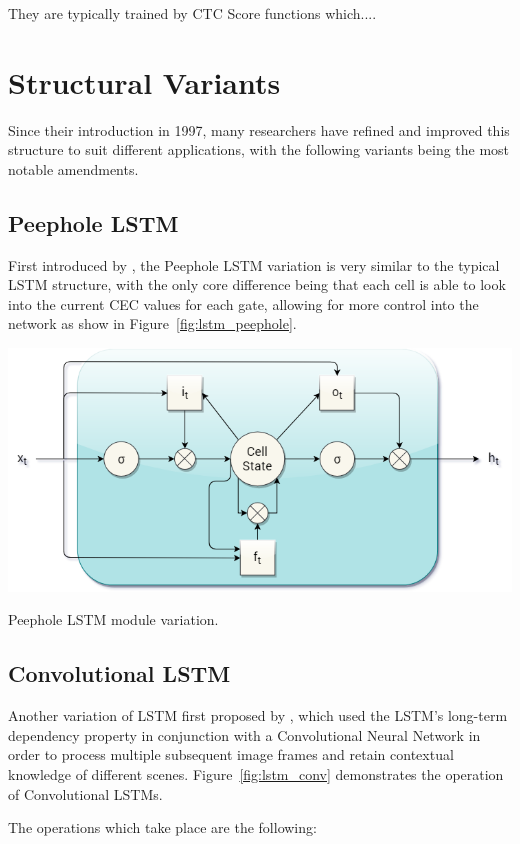 They are typically trained by CTC Score functions \citep{Graves:2006:CTC:1143844.1143891} which.... 

\section{Structural Variants}
Since their introduction in 1997, many researchers have refined and improved this structure to suit different applications, with the following variants being the most notable amendments.

\subsection{Peephole LSTM}
First introduced by \citet{Gers:2003:LPT:944919.944925}, the Peephole LSTM variation is very similar to the typical LSTM structure, with the only core difference being that each cell is able to look into the current CEC values for each gate, allowing for more control into the network as show in Figure~\ref{fig:lstm_peephole}.

\begin{marginfigure}
	\centering
	\includegraphics[width=0.6\linewidth]{graphics/lstm/lstm_peephole.png}
	\caption{
		Peephole LSTM module variation.
	}
	\label{fig:lstm_peephole}
\end{marginfigure}

\subsection{Convolutional LSTM}
Another variation of LSTM first proposed by \citet{Shi:2015:CLN:2969239.2969329}, which used the LSTM's long-term dependency property in conjunction with a Convolutional Neural Network in order to process multiple subsequent image frames and retain contextual knowledge of different scenes. Figure~\ref{fig:lstm_conv} demonstrates the operation of Convolutional LSTMs.

The operations which take place are the following:

